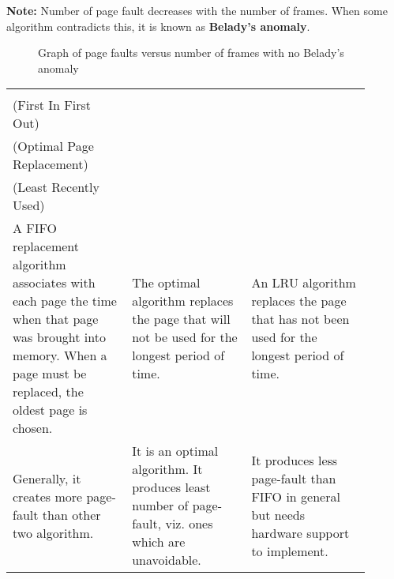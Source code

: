 \documentclass[12pt,onecolumn]{IEEEtran}
\begin{document}
\textbf{Note:} Number of page fault decreases with the number of frames. When some algorithm 
contradicts this, it is known as \textbf{Belady's anomaly}.
\begin{figure}[H]
	\centering
	\caption{Graph of page faults versus number of frames with no Belady's anomaly}
\end{figure}
\begin{table}[H]
	\centering
	\begin{tabular}{|p{0.3\linewidth} | p{0.3\linewidth}|p{0.3\linewidth} |}
		\hline
		\begin{center}
			\textbf{FIFO} \\ (First In First Out)
		\end{center}
		&
		\begin{center}
			\textbf{OPT} \\  (Optimal Page Replacement)
		\end{center}
		&
		\begin{center}
			\textbf{LRU} \\  (Least Recently Used)
		\end{center} \\
		\hline
		\vspace{1mm}
		A FIFO replacement algorithm associates with each page the time when that page was brought into memory. When a page must be replaced, the oldest page is chosen.

		\vspace{1mm}
		& 
		\vspace{1mm}
		The optimal algorithm replaces the page that will not be used for the longest period of time.
		
		\vspace{1mm}
		&
		\vspace{1mm}
		An LRU algorithm replaces the page that has not been used for the longest period of time.
		
		\vspace{1mm}\\
		\hline
		\vspace{1mm}
		Generally, it creates more page-fault than other two algorithm.

		\vspace{1mm}
		& 
		\vspace{1mm}
		It is an optimal algorithm. It produces least number of page-fault, viz. ones which are unavoidable.
		\vspace{1mm}
		&
		\vspace{1mm}
		It produces less page-fault than FIFO in general but needs hardware support to implement.
		

\end{tabular}
\end{table}
\end{document}
